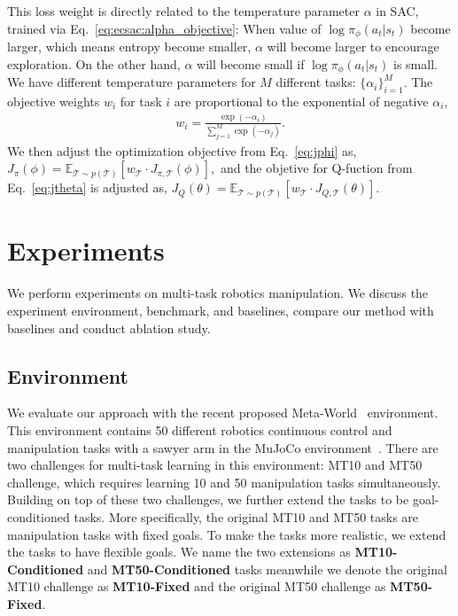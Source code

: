 \documentclass{article}
\newcommand{\task}{\mathcal{T}}
\begin{document}
This loss weight is directly related to the temperature parameter $\alpha$ in SAC, trained via Eq.~\ref{eq:ecsac:alpha_objective}: When value of $\log \pi_\phi(a_t|s_t)$ become larger, which means entropy become smaller, $\alpha$ will become larger to encourage exploration. On the other hand, $\alpha$ will become small if $\log \pi_\phi(a_t|s_t)$ is small. We have different temperature parameters for $M$ different tasks: $\{\alpha_i\}_{i=1}^M$. The objective weights $w_i$ for task $i$ are proportional to the exponential of negative $\alpha_i$,
\vspace{-0.1in}
\begin{align}
w_i  = \frac{\exp{(-\alpha_i)}}{\sum_{j=1}^M \exp{(-\alpha_j)}}.
\label{eq:ecsac:multitask_alpha_objective}
\end{align}
We then adjust the optimization objective from Eq.~\ref{eq:jphi} as,
$J_\pi(\phi)=\mathbb{E}_{\task \sim p(\task)} \left[w_\task \cdot J_{\pi, \task}(\phi) \right],$
and the objetive for Q-fuction from Eq.~\ref{eq:jtheta} is adjusted as,
$
J_Q(\theta)=\mathbb{E}_{\task \sim p(\task)} \left[w_\task \cdot J_{Q, \task}(\theta) \right].$
 
\vspace{-0.1in}
\section{Experiments}\label{sec:expr}
\vspace{-0.1in}
We perform experiments on multi-task robotics manipulation. We discuss the experiment environment, benchmark, and baselines,  compare our method with baselines and conduct ablation study. 

\vspace{-0.07in}
\subsection{Environment}
\vspace{-0.07in}
We evaluate our approach with the recent proposed Meta-World~\cite{yu2019meta} environment. This environment contains 50 different robotics continuous control and manipulation tasks with a sawyer arm in the MuJoCo environment~\cite{todorov2012mujoco}. There are two challenges for multi-task learning in this environment: MT10 and MT50 challenge, which requires learning 10 and 50 manipulation tasks simultaneously. Building on top of these two challenges, we further extend the tasks to be goal-conditioned tasks. More specifically, the original MT10 and MT50 tasks are manipulation tasks with fixed goals. To make the tasks more realistic, we extend the tasks to have flexible goals. We name the two extensions as \textbf{MT10-Conditioned} and \textbf{MT50-Conditioned} tasks meanwhile we denote the original MT10 challenge as \textbf{MT10-Fixed} and the original MT50 challenge as \textbf{MT50-Fixed}.
 
\end{document}
